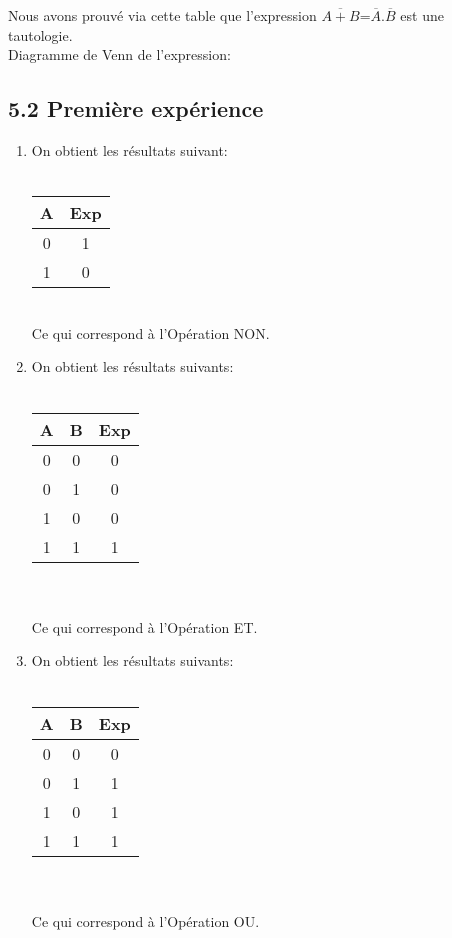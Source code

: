\documentclass{report}
\begin{document}
\hspace*{1,5cm} Nous avons prouv\'e via cette table que l'expression $\overline{A+B}$=$\overline{A}.\overline{B}$ est une tautologie.\\
\newpage
\hspace*{1,5cm} Diagramme de Venn de l'expression:\\
\newpage
\subsection*{5.2 Premi\`ere exp\'erience}
\begin{enumerate}
\item On obtient les r\'esultats suivant:\\
\\
\begin{tabular}{|c|c|}
\hline
A & Exp \\
\hline
0&1\\
1&0\\
\hline
\end{tabular}\\
\hspace*{1,2cm} Ce qui correspond \`a l'Op\'eration NON.
\item On obtient les résultats suivants:\\
\\
\begin{tabular}{|c|c|c|}
\hline
A & B & Exp \\
\hline
0&0&0\\
0&1&0\\
1&0&0\\
1&1&1\\
\hline
\end{tabular}\\
\\
\hspace*{1,2cm} Ce qui correspond \`a l'Op\'eration ET.
\item On obtient les résultats suivants:\\
\\
\begin{tabular}{|c|c|c|}
\hline
A & B & Exp \\
\hline
0&0&0\\
0&1&1\\
1&0&1\\
1&1&1\\
\hline
\end{tabular}\\
\\
\hspace*{1,2cm} Ce qui correspond \`a l'Op\'eration OU.

\end{enumerate}
\end{document}
